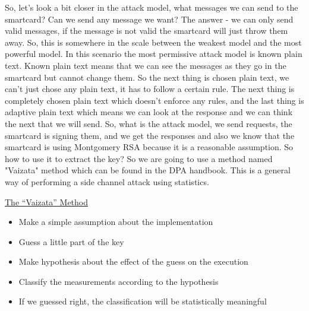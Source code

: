 So, let’s look a bit closer in the attack model, what messages we can send to the smartcard? Can we send any message we want? The answer - we can only send valid messages, if the message is not valid the smartcard will just throw them away. So, this is somewhere in the scale between the weakest model and the most powerful model. In this scenario the most permissive attack model is known plain text. Known plain text means that we can see the messages as they go in the smartcard but cannot change them. So the next thing is chosen plain text, we can’t  just chose any plain text, it has to follow a certain rule. The next thing is completely chosen plain text which doesn’t enforce any rules, and the last thing is adaptive plain text which means we can look at the response and we can think the next that we will send. So, what is the attack model, we send requests, the smartcard is signing them, and we get the responses and also we know that the smartcard is using Montgomery RSA because it is a reasonable assumption. So how to use it to extract the key? So we are going to use a method named "Vaizata" method which can be found in the DPA handbook. This is a general way of performing a side channel attack using statistics. \newline

\underline{The “Vaizata” Method}
\begin{itemize}
	\item Make a simple assumption about the implementation
	\item Guess a little part of the key
	\item Make hypothesis about the effect of the guess on the execution
	\item Classify the measurements according to the hypothesis
	\item If we guessed right, the classification will be statistically meaningful
\end{itemize}

